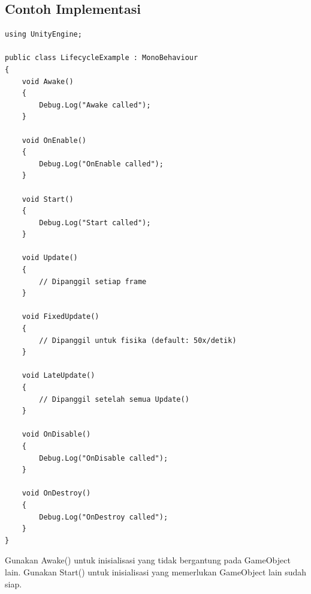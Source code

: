\subsection{Contoh Implementasi}

\begin{lstlisting}[language={[Sharp]C}, caption=Contoh Lifecycle Functions]
using UnityEngine;

public class LifecycleExample : MonoBehaviour
{
    void Awake()
    {
        Debug.Log("Awake called");
    }
    
    void OnEnable()
    {
        Debug.Log("OnEnable called");
    }
    
    void Start()
    {
        Debug.Log("Start called");
    }
    
    void Update()
    {
        // Dipanggil setiap frame
    }
    
    void FixedUpdate()
    {
        // Dipanggil untuk fisika (default: 50x/detik)
    }
    
    void LateUpdate()
    {
        // Dipanggil setelah semua Update()
    }
    
    void OnDisable()
    {
        Debug.Log("OnDisable called");
    }
    
    void OnDestroy()
    {
        Debug.Log("OnDestroy called");
    }
}
\end{lstlisting}

\begin{catatan}
Gunakan Awake() untuk inisialisasi yang tidak bergantung pada GameObject lain. Gunakan Start() untuk inisialisasi yang memerlukan GameObject lain sudah siap.
\end{catatan}

